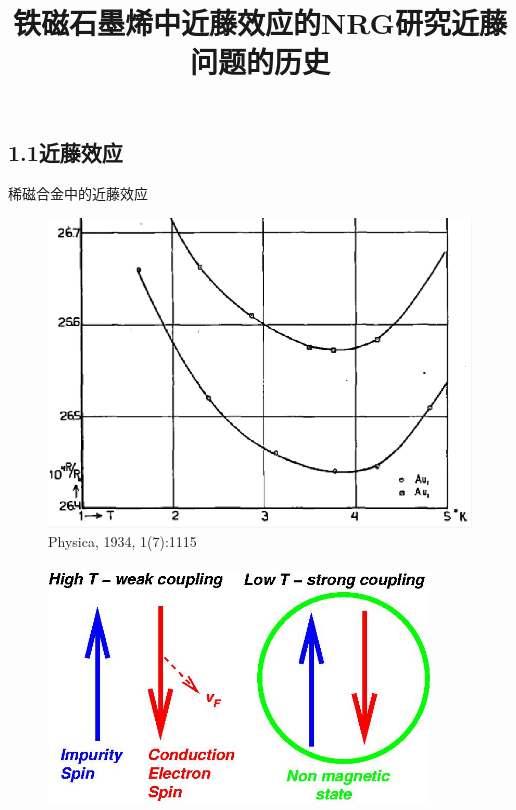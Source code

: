 \documentclass[9pt,t]{beamer} %
\begin{document}
\subsection{1.1近藤效应}
\title{铁磁石墨烯中近藤效应的NRG研究\qquad \qquad \qquad \qquad 近藤问题的历史}
\begin{frame}{稀磁合金中的近藤效应}
\begin{minipage}[t]{0.4 \textwidth}
\begin{figure}
\centering
\includegraphics[width=\textwidth]{kondo-deHaas.png}
Physica, 1934, 1(7):1115\\ \ \\
\includegraphics[width=0.9\textwidth]{Kscheme.jpg}
\end{figure}
\end{minipage}%
\begin{minipage}[t]{0.6 \textwidth}
\vspace{0.3cm}
\begin{itemize}

\end{itemize}
\end{minipage}
\end{frame}
\end{document}
